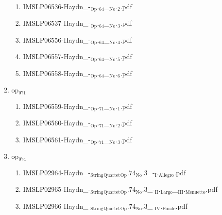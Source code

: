 \documentclass[11pt]{article}
\begin{document}
\begin{enumerate}
\begin{enumerate}
\begin{enumerate}
\item IMSLP06536-Haydn\_-$_{\text{Op}}$.$_{\text{64}}$\_$_{\text{No}}$.$_{\text{2}}$.pdf
\label{sec-1-1-1-1-44-38-6-13-2}

\item IMSLP06537-Haydn\_-$_{\text{Op}}$.$_{\text{64}}$\_$_{\text{No}}$.$_{\text{3}}$.pdf
\label{sec-1-1-1-1-44-38-6-13-3}

\item IMSLP06556-Haydn\_-$_{\text{Op}}$.$_{\text{64}}$\_$_{\text{No}}$.$_{\text{4}}$.pdf
\label{sec-1-1-1-1-44-38-6-13-4}

\item IMSLP06557-Haydn\_-$_{\text{Op}}$.$_{\text{64}}$\_$_{\text{No}}$.$_{\text{5}}$.pdf
\label{sec-1-1-1-1-44-38-6-13-5}

\item IMSLP06558-Haydn\_-$_{\text{Op}}$.$_{\text{64}}$\_$_{\text{No}}$.$_{\text{6}}$.pdf
\label{sec-1-1-1-1-44-38-6-13-6}
\end{enumerate}

\item op$_{\text{071}}$
\label{sec-1-1-1-1-44-38-6-14}
\begin{enumerate}
\item IMSLP06559-Haydn\_-$_{\text{Op}}$.$_{\text{71}}$\_$_{\text{No}}$.$_{\text{1}}$.pdf
\label{sec-1-1-1-1-44-38-6-14-1}

\item IMSLP06560-Haydn\_-$_{\text{Op}}$.$_{\text{71}}$\_$_{\text{No}}$.$_{\text{2}}$.pdf
\label{sec-1-1-1-1-44-38-6-14-2}

\item IMSLP06561-Haydn\_-$_{\text{Op}}$.$_{\text{71}}$\_$_{\text{No}}$.$_{\text{3}}$.pdf
\label{sec-1-1-1-1-44-38-6-14-3}
\end{enumerate}

\item op$_{\text{074}}$
\label{sec-1-1-1-1-44-38-6-15}
\begin{enumerate}
\item IMSLP02964-Haydn\_-$_{\text{String}}$$_{\text{Quartet}}$$_{\text{Op}}$.74$_{\text{No}}$.3\_-$_{\text{I}}$.$_{\text{Allegro}}$.pdf
\label{sec-1-1-1-1-44-38-6-15-1}

\item IMSLP02965-Haydn\_-$_{\text{String}}$$_{\text{Quartet}}$$_{\text{Op}}$.74$_{\text{No}}$.3\_-$_{\text{II}}$.$_{\text{Largo}}$\_$_{\text{III}}$.$_{\text{Menuetto}}$.pdf
\label{sec-1-1-1-1-44-38-6-15-2}

\item IMSLP02966-Haydn\_-$_{\text{String}}$$_{\text{Quartet}}$$_{\text{Op}}$.74$_{\text{No}}$.3\_-$_{\text{IV}}$.$_{\text{Finale}}$.pdf
\label{sec-1-1-1-1-44-38-6-15-3}


\end{enumerate}
\end{enumerate}
\end{enumerate}
\end{document}
